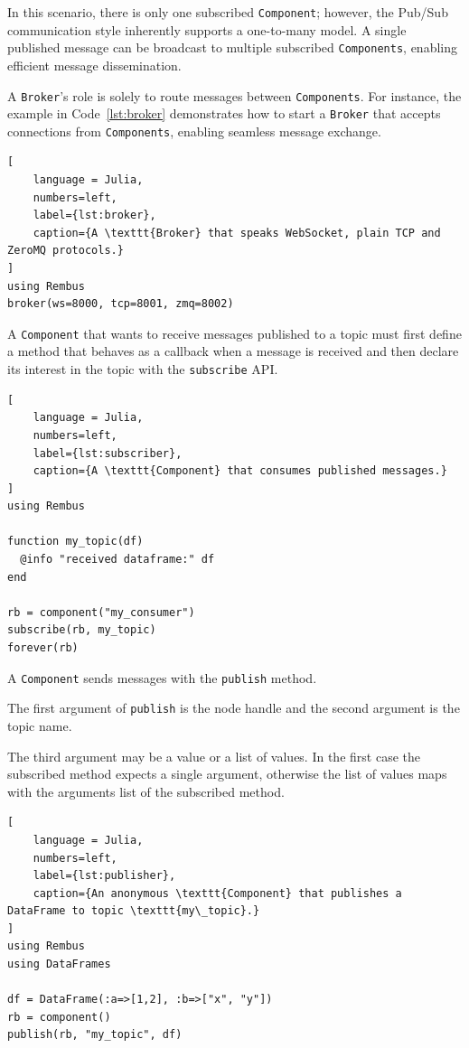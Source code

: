 \documentclass{juliacon}
\begin{document}
In this scenario, there is only one subscribed \texttt{Component}; however, the
Pub/Sub communication style inherently supports a one-to-many model. A single
published message can be broadcast to multiple subscribed \texttt{Components},
enabling efficient message dissemination.
\vskip 6pt

A \texttt{Broker}'s role is solely to route messages between \texttt{Components}.
For instance, the example in Code~\ref{lst:broker} demonstrates how to start a
\texttt{Broker} that accepts connections from \texttt{Components},
enabling seamless message exchange.

\begin{lstlisting}[
    language = Julia, 
    numbers=left, 
    label={lst:broker}, 
    caption={A \texttt{Broker} that speaks WebSocket, plain TCP and ZeroMQ protocols.}
]
using Rembus
broker(ws=8000, tcp=8001, zmq=8002)
\end{lstlisting}

A \texttt{Component} that wants to receive messages published to a topic
must first define a method that behaves as a callback when a message is
received and then declare its interest in the topic with the
\texttt{subscribe} API.

\begin{lstlisting}[
    language = Julia, 
    numbers=left, 
    label={lst:subscriber}, 
    caption={A \texttt{Component} that consumes published messages.}
]
using Rembus

function my_topic(df)
  @info "received dataframe:" df
end

rb = component("my_consumer")
subscribe(rb, my_topic)
forever(rb)
\end{lstlisting}

A \texttt{Component} sends messages with the \texttt{publish} method.
\vskip 6pt

The first argument of \texttt{publish} is the node handle and the second
argument is the topic name.
\vskip 6pt

The third argument may be a value or a list of values. In the first case
the subscribed method expects a single argument, otherwise the list of
values maps with the arguments list of the subscribed method.

\begin{lstlisting}[
    language = Julia, 
    numbers=left, 
    label={lst:publisher}, 
    caption={An anonymous \texttt{Component} that publishes a DataFrame to topic \texttt{my\_topic}.}
]
using Rembus
using DataFrames

df = DataFrame(:a=>[1,2], :b=>["x", "y"])
rb = component()
publish(rb, "my_topic", df)
\end{lstlisting}
\end{document}

